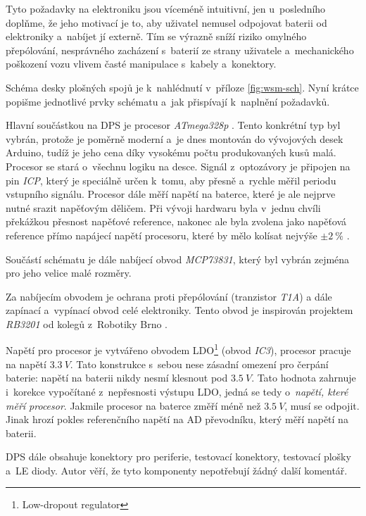Tyto požadavky na elektroniku jsou víceméně intuitivní, jen u~posledního
doplňme, že jeho motivací je to, aby uživatel nemusel odpojovat baterii od
elektroniky a~nabíjet jí externě. Tím se výrazně sníží riziko omylného
přepólování, nesprávného zacházení s~baterií ze strany uživatele a~mechanického
poškození vozu vlivem časté manipulace s~kabely a~konektory.

Schéma desky plošných spojů je k~nahlédnutí v~příloze \ref{fig:wsm-sch}. Nyní
krátce popišme jednotlivé prvky schématu a~jak přispívají k~naplnění požadavků.

Hlavní součástkou na DPS je procesor \textit{ATmega328p}
\cite{atmega328p:datasheet}.  Tento konkrétní typ byl vybrán, protože je
poměrně moderní a~je dnes montován do vývojových desek Arduino, tudíž je jeho
cena díky vysokému počtu produkovaných kusů malá. Procesor se stará o~všechnu
logiku na desce.  Signál z~optozávory je připojen na pin \textit{ICP}, který je
speciálně určen k~tomu, aby přesně a~rychle měřil periodu vstupního signálu.
Procesor dále měří napětí na baterce, které je ale nejprve nutné srazit
napěťovým děličem. Při vývoji hardwaru byla v~jednu chvíli překážkou přesnost
napěťové reference, nakonec ale byla zvolena jako napěťová reference přímo
napájecí napětí procesoru, které by mělo kolísat nejvýše $\pm 2\ \%$
\cite{ldo:datasheet}.

Součástí schématu je dále nabíjecí obvod \textit{MCP73831}, který byl vybrán
zejména pro jeho velice malé rozměry.

Za nabíjecím obvodem je ochrana proti přepólování (tranzistor \textit{T1A}) a
dále zapínací a~vypínací obvod celé elektroniky. Tento obvod je inspirován
projektem \textit{RB3201} \cite{rb3201} od kolegů z~Robotiky Brno
\cite{roboticsbrno}.

Napětí pro procesor je vytvářeno obvodem LDO\footnote{Low-dropout regulator}
(obvod \textit{IC3}), procesor pracuje na napětí $3.3\ V$. Tato konstrukce
s~sebou nese zásadní omezení pro čerpání baterie: napětí na baterii nikdy nesmí
klesnout pod $3.5\ V$. Tato hodnota zahrnuje i~korekce vypočítané z~nepřesnosti
výstupu LDO, jedná se tedy o~\textit{napětí, které měří procesor}. Jakmile
procesor na baterce změří méně než $3.5\ V$, musí se odpojit. Jinak hrozí
pokles referenčního napětí na AD převodníku, který měří napětí na baterii.

DPS dále obsahuje konektory pro periferie, testovací konektory, testovací
plošky a~LE diody. Autor věří, že tyto komponenty nepotřebují žádný další
komentář.

